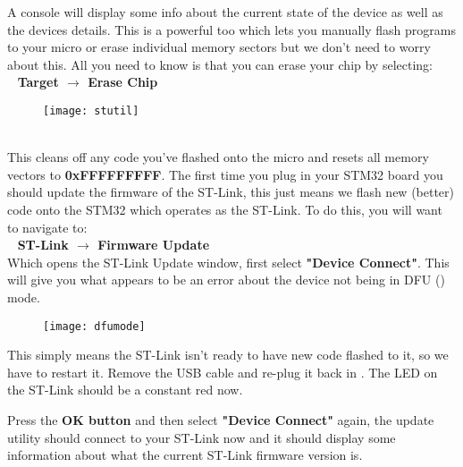 \newpage
A console will display some info about the current state of the device as well as the devices details.  This is a powerful too which lets you manually flash programs to your micro  or erase individual memory sectors but we don’t need to worry about this. All you need to know is that you can erase your chip by selecting:\\
\-\ \hspace{20pt}\textbf{\color{Green} Target $\rightarrow$ Erase Chip}
\\
\begin{figure}[htbp]
\centering
\texttt{[image: stutil]}
\end{figure}
\\
This cleans off any code you've flashed onto the micro and resets all memory vectors to \textbf{0xFFFFFFFFF}.
The first \underline{} time you plug in your STM32 board you should update the firmware of the ST-Link, this just means we flash new (better) code onto the STM32 which operates as the ST-Link.
To do this, you will want to navigate to:\\
\-\ \hspace{20pt}\textbf{\color{Green} ST-Link $\rightarrow$ Firmware Update}
\\
Which opens the ST-Link Update window, first select \textbf{\color{Purple} "Device Connect"}. This will give you what appears to be an error about the device not being in DFU (\underline{}) mode.\\
\begin{figure}[hbtp]
\centering
\texttt{[image: dfumode]}
\end{figure}
\newpage
This simply means the ST-Link isn't ready to have new code flashed to it, so we have to restart it. Remove the USB cable and re-plug it back in {\color{red}\underline{}}. The LED on the ST-Link should be a constant red now.
\par
Press the \textbf{\color{Purple} OK button} and then select \textbf{\color{Purple} "Device Connect"} again, the update utility should connect to your ST-Link now and it should display some information about what the current ST-Link firmware version is.
